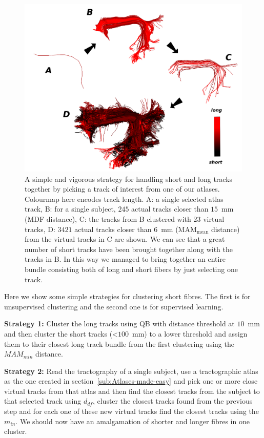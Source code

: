 \documentclass[preprint,authoryear,a4paper,10pt,onecolumn]{elsarticle}
\begin{document}
%
\begin{figure}
\begin{centering}
\includegraphics[scale=0.7]{last_figures/arcuate_small_fibers}
\par\end{centering}
\caption{A simple and vigorous strategy for handling short and long
  tracks together by picking a track of interest from one of our
  atlases. Colourmap here encodes track length. A: a single selected
  atlas track, B: for a single subject, $245$ actual tracks closer than
  $15$~mm (MDF distance), C: the tracks from B clustered with $23$
  virtual tracks, D: $3421$ actual tracks closer than $6$~mm
  ($\textrm{MAM}_{\textrm{mean}}$ distance) from the virtual tracks in C
  are shown. We can see that a great number of short tracks have been
  brought together along with the tracks in B. In this way we managed to
  bring together an entire bundle consisting both of long and short
  fibers by just selecting one track.\label{Flo:arcuate_close}}
\end{figure}


Here we show some simple strategies for clustering short fibres. The first
is for unsupervised clustering and the second one is for supervised
learning.

\textbf{Strategy 1:} Cluster the long tracks using QB with distance
threshold at $10$~mm and then cluster the short tracks (<$100$~mm) to a
lower threshold and assign them to their closest long track bundle from
the first clustering using the $MAM_{min}$ distance.

\textbf{Strategy 2:} Read the tractography of a single subject, use a
tractographic atlas as the one created in
section~\ref{sub:Atlases-made-easy} and pick one or more close virtual
tracks from that atlas and then find the closest tracks from the subject
to that selected track using $d_{df}$, cluster the closest tracks found
from the previous step and for each one of these new virtual tracks find
the closest tracks using the $m_{in}$. We should now have an
amalgamation of shorter and longer fibres in one cluster.
\end{document}
